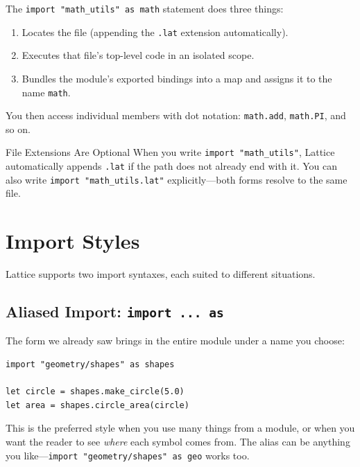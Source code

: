 The \lstinline|import "math_utils" as math| statement does three things:

\begin{enumerate}
  \item Locates the file  (appending the \texttt{.lat} extension automatically).
  \item Executes that file's top-level code in an isolated scope.
  \item Bundles the module's exported bindings into a map and assigns it to the name \lstinline|math|.
\end{enumerate}

You then access individual members with dot notation: \lstinline|math.add|, \lstinline|math.PI|, and so on.

\begin{tipbox}{File Extensions Are Optional}
When you write \lstinline|import "math_utils"|, Lattice automatically appends \texttt{.lat} if the path does not already end with it.
You can also write \lstinline|import "math_utils.lat"| explicitly---both forms resolve to the same file.
\end{tipbox}

\section{Import Styles}\label{sec:import-styles}

Lattice supports two import syntaxes, each suited to different situations.

\subsection{Aliased Import: \texttt{import ... as}}\label{subsec:import-as}

The form we already saw brings in the entire module under a name you choose:

\begin{lstlisting}[language=Lattice, caption={Aliased import}]
import "geometry/shapes" as shapes

let circle = shapes.make_circle(5.0)
let area = shapes.circle_area(circle)
\end{lstlisting}

This is the preferred style when you use many things from a module, or when you want the reader to see \emph{where} each symbol comes from.
The alias can be anything you like---\lstinline|import "geometry/shapes" as geo| works too.

